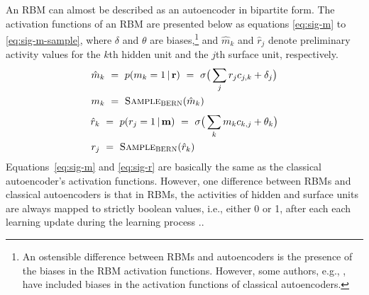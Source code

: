 An RBM can almost be described as an autoencoder in bipartite form. 
The activation functions of an RBM are presented below as equations \eqref{eq:sig-m} to \eqref{eq:sig-m-sample}, where $\delta$ and $\theta$ are biases,\footnote{An ostensible difference between RBMs and autoencoders
is the presence of the biases in the 
RBM activation functions. However, some authors, e.g., \citet{rudy-and-taylor:2014}, have included biases in the activation functions of classical autoencoders.} and $\hat{m}_k$ and $\hat{r}_j$ denote preliminary activity values for the $k$th hidden unit and the $j$th surface unit, respectively.
\begin{align}
\label{eq:sig-m}
\hat{m}_k\,\, &= \,\,p(m_{k}=1 \, | \, \mathbf{r}) \,\, = \,\, \sigma\big(\sum_{j} r_{j} c_{j,k} + \delta_{j}\big) \\
\label{eq:sig-m-sample}
m_{k}\,\,&= \,\,\textsc{Sample}_{\textsc{BERN}}(\hat{m}_k)
\end{align}
\begin{align}
\label{eq:sig-r}
\hat{r}_k \,\,&= \,\,p(r_{j}=1 \, | \, \mathbf{m}) \,\, =  \,\, \sigma\big(\sum_{k}  m_{k} c_{k,j} + \theta_{k}\big) \\
\label{eq:sig-r-sample}
r_{j} \,\, &= \,\, \textsc{Sample}_{\textsc{BERN}}(\hat{r}_k)
\end{align}
Equations~\eqref{eq:sig-m} and \eqref{eq:sig-r} are basically the same as the classical autoencoder's activation functions. 
However, one difference between RBMs and  classical autoencoders is that in RBMs, the activities of hidden and surface units are always mapped to strictly boolean values, i.e., either 0 or 1, after each each learning update during the learning process \citep{hinton:2012}.. 
